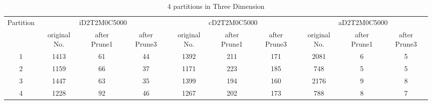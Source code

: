 \begin{table*}[t]
  \centering
\makeatletter
    \long{}
\makeatother
  \caption{4 partitions in Three Dimension}
    \vspace*{3pt}
  \footnotesize

  \label{table:partition4inThree}
  \begin{tabular}{|c||c|c|c|c|c|c|c|c|c|}
  \hline
  \multirow{2}{*}{Partition} &  \multicolumn{3}{|c|}{iD2T2M0C5000} & \multicolumn{3}{|c|}{cD2T2M0C5000} &\multicolumn{3}{|c|}{aD2T2M0C5000} \\\cline{2-10}
    &  original No. & after Prune1 & after Prune3 & original No. & after Prune1 & after Prune3 & original No. & after Prune1 & after Prune3\\\hline\hline

\cline{2-10}
    1 &  1413 & 61 & 44 & 1392 & 211 & 171 & 2081 & 6 & 5 \\\hline

\cline{2-10}
    2 &  1159 & 66 & 37 & 1171 & 223 & 185 & 748 & 5 & 5 \\\hline

\cline{2-10}
    3 &  1447 & 63 & 35 & 1399 & 194 & 160 & 2176 & 9 & 8 \\\hline
    
\cline{2-10}
    4 &  1228 & 92 & 46 & 1267 & 202 & 173 & 788 & 8 & 7 \\\hline
    
  \end{tabular}
  \vspace*{-17pt}
\end{table*}


